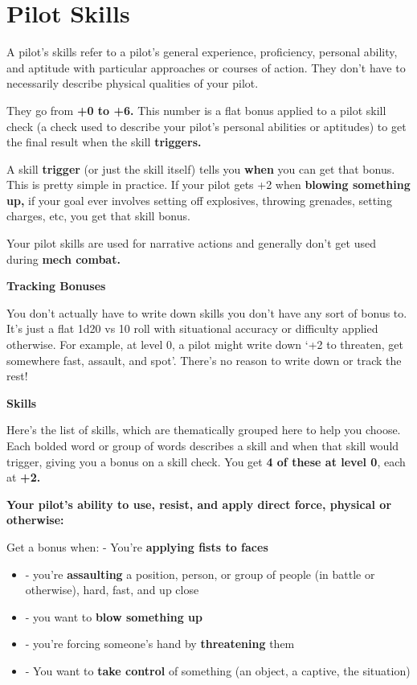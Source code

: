 \section{Pilot Skills}

A pilot’s skills refer to a pilot’s general experience, proficiency, personal ability, and aptitude with
particular approaches or courses of action. They don’t have to necessarily describe physical
qualities of your pilot.

They go from \textbf{+0 to +6.} This number is a flat bonus applied to a pilot skill check (a check used to
describe your pilot’s personal abilities or aptitudes) to get the final result
when the skill \textbf{triggers.} 

A skill \textbf{trigger} (or just the skill itself) tells you \textbf{when} you can get that bonus. This is pretty simple in
practice. If your pilot gets +2 when \textbf{blowing something up,} if your goal ever involves setting off
explosives, throwing grenades, setting charges, etc, you get that skill bonus.

Your pilot skills are used for narrative actions and generally don’t get used during \textbf{mech combat.} 

\begin{center}
\textbf{Tracking Bonuses}
\end{center}


You don’t actually have to write down skills you don’t have any sort of bonus to. It’s just a flat
1d20 vs 10 roll with situational accuracy or difficulty applied otherwise. For example, at level 0, a
pilot might write down ‘+2 to threaten, get somewhere fast, assault, and spot’. There’s no reason
to write down or track the rest!


\begin{center}
\textbf{Skills}
\end{center}

Here’s the list of skills, which are thematically grouped here to help you choose. Each bolded
word or group of words describes a skill and when that skill would trigger, giving you a bonus on a
skill check. You get \textbf{4 of these at level 0}, each at \textbf{+2.} 

\textbf{Your pilot’s ability to use, resist, and apply direct force, physical or otherwise:}

Get a bonus when: - You’re \textbf{applying fists to faces}
\begin{itemize}
\item - you’re \textbf{assaulting} a position, person, or group of people (in battle or otherwise), hard, fast, and up close
\item - you want to \textbf{blow something up}
\item - you’re forcing someone’s hand by \textbf{threatening} them
\item - You want to \textbf{take control} of something (an object, a captive, the situation)
\end{itemize}  


